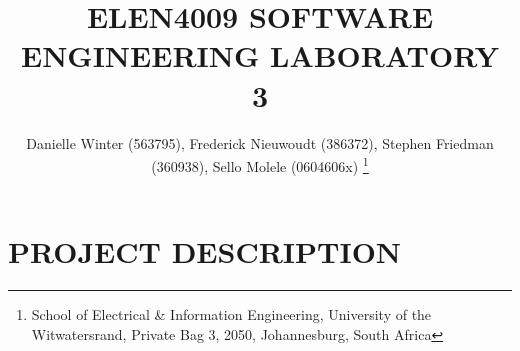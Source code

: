 \documentclass[10pt,twocolumn]{witseiepaper}
\begin{document}
\title{ELEN4009 SOFTWARE ENGINEERING LABORATORY 3}

\author{Danielle Winter (563795), Frederick Nieuwoudt (386372), Stephen Friedman (360938), Sello Molele (0604606x)
\thanks{School of Electrical \& Information Engineering, University of the
Witwatersrand, Private Bag 3, 2050, Johannesburg, South Africa}
}


%
\abstract{}

\keywords{}


\maketitle
\thispagestyle{empty}\pagestyle{empty}


%
\section{PROJECT DESCRIPTION}
\end{document}

